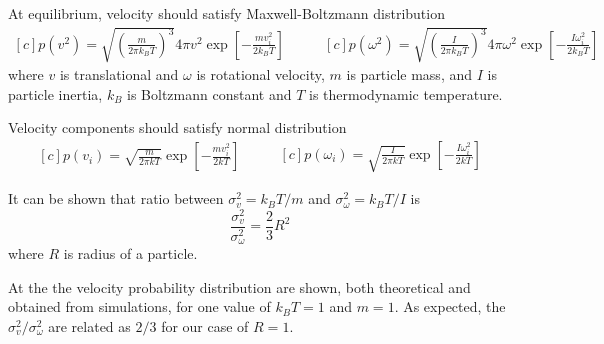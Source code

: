 At equilibrium, velocity should satisfy Maxwell-Boltzmann distribution
\begin{equation}
\label{eq:maxwell_boltzmann_velocity}
	\begin{aligned}[c]
		p(v^2)
			= \sqrt{ \left(\frac{m}{2 \pi k_B T}\right)^3}
			4 \pi v^2 \exp \left[-\frac{mv_i^2}{2k_BT}\right]
	\end{aligned}
	\qquad
	\begin{aligned}[c]
		p(\omega^2)
			= \sqrt{ \left(\frac{I}{2 \pi k_B T}\right)^3}
			4 \pi \omega^2 \exp\left[-\frac{I\omega_i^2}{2 k_B T}\right]
	\end{aligned}
\end{equation}
where $v$ is translational and $\omega$ is rotational velocity, $m$ is particle mass, and $I$ is particle inertia, $k_B$ is Boltzmann constant and $T$ is thermodynamic temperature.

Velocity components should satisfy normal distribution 
\begin{equation}
\label{eq:maxwell_boltzmann_velocity_components}
	\begin{aligned}[c]
		p(v_i)
			= \sqrt{ \frac{m}{2 \pi k T}}
			\exp \left[-\frac{mv_i^2}{2kT}\right]
	\end{aligned}
	\qquad
	\begin{aligned}[c]
		p(\omega_i)
			= \sqrt{ \frac{I}{2 \pi k T}}
			\exp\left[-\frac{I\omega_i^2}{2kT}\right]
	\end{aligned}
\end{equation}

It can be shown that ratio between $\sigma^2_v = k_BT/m$ and $\sigma^2_\omega = k_BT/I$ is
\begin{equation}
\label{eq:velocity_deviation_relation}
	\frac{\sigma^2_v}{\sigma^2_\omega} = \frac{2}{3}R^2
\end{equation}
where $R$ is radius of a particle.

At the  the velocity probability distribution are shown, both theoretical and obtained from simulations, for one value of $k_BT = 1$ and $m = 1$. As expected, the $\sigma^2_v / \sigma^2_\omega$ are related as $2/3$ for our case of $R = 1$.


